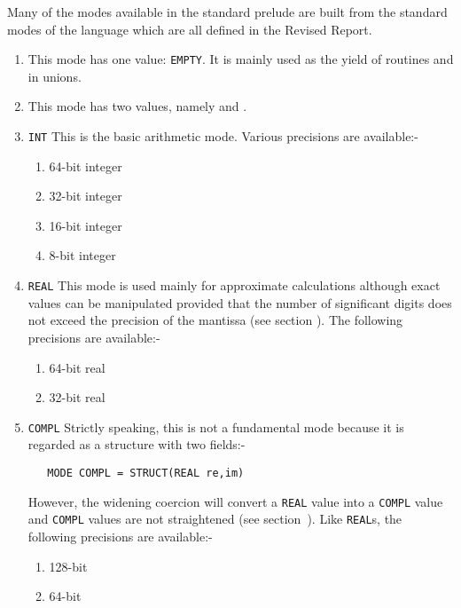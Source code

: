 Many of the modes available in the standard prelude are built from the
standard modes of the language which are all defined in the Revised
Report.
\begin{enumerate}
\item {} \newline
This mode has one value: \verb|EMPTY|. It is mainly used as the yield
of routines and in unions.
\item {} \newline
 This mode has
two values, namely  and
.
\item \verb|INT| \newline
This is the basic arithmetic mode. Various precisions are available:-
\begin{enumerate}
\item {} 64-bit integer
\item {} 32-bit integer
\item {} 16-bit
integer
\item {} 8-bit integer
\end{enumerate}
\item \verb|REAL|\newline
This mode is used mainly for approximate calculations although exact
values can be manipulated provided that the number of significant
digits does not exceed the precision of the mantissa (see section
). The following precisions are available:-
\begin{enumerate}
\item {} 64-bit real
\item {} 32-bit real
\end{enumerate}
\item \verb|COMPL| \newline
Strictly speaking, this is not a fundamental mode because it is
regarded as a structure with two fields:-
\begin{verbatim}
   MODE COMPL = STRUCT(REAL re,im)
\end{verbatim}
\noindent
However, the widening coercion will convert a \verb|REAL| value into a
\verb|COMPL| value and \verb|COMPL| values are not straightened (see
section~). Like \verb|REAL|s, the following
precisions are available:-
\begin{enumerate}
\item {} 128-bit
\item {} 64-bit

\end{enumerate}
\end{enumerate}
